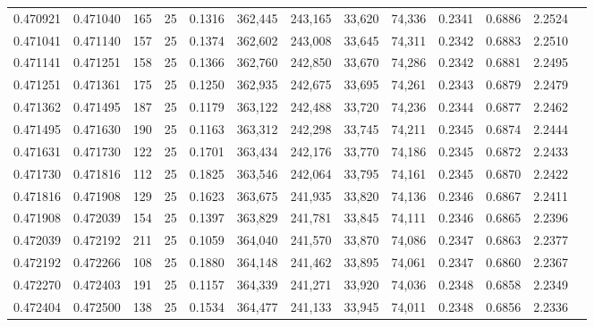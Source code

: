 \begin{tabular}{rrrrrrrrrrrrr}
0.470921 & 0.471040 &   165 &  25 &                                     0.1316 & 362,445 & 243,165 &  33,620 &  74,336 & 0.2341 & 0.6886 & 2.2524 \\
0.471041 & 0.471140 &   157 &  25 &                                     0.1374 & 362,602 & 243,008 &  33,645 &  74,311 & 0.2342 & 0.6883 & 2.2510 \\
0.471141 & 0.471251 &   158 &  25 &                                     0.1366 & 362,760 & 242,850 &  33,670 &  74,286 & 0.2342 & 0.6881 & 2.2495 \\
0.471251 & 0.471361 &   175 &  25 &                                     0.1250 & 362,935 & 242,675 &  33,695 &  74,261 & 0.2343 & 0.6879 & 2.2479 \\
0.471362 & 0.471495 &   187 &  25 &                                     0.1179 & 363,122 & 242,488 &  33,720 &  74,236 & 0.2344 & 0.6877 & 2.2462 \\
0.471495 & 0.471630 &   190 &  25 &                                     0.1163 & 363,312 & 242,298 &  33,745 &  74,211 & 0.2345 & 0.6874 & 2.2444 \\
0.471631 & 0.471730 &   122 &  25 &                                     0.1701 & 363,434 & 242,176 &  33,770 &  74,186 & 0.2345 & 0.6872 & 2.2433 \\
0.471730 & 0.471816 &   112 &  25 &                                     0.1825 & 363,546 & 242,064 &  33,795 &  74,161 & 0.2345 & 0.6870 & 2.2422 \\
0.471816 & 0.471908 &   129 &  25 &                                     0.1623 & 363,675 & 241,935 &  33,820 &  74,136 & 0.2346 & 0.6867 & 2.2411 \\
0.471908 & 0.472039 &   154 &  25 &                                     0.1397 & 363,829 & 241,781 &  33,845 &  74,111 & 0.2346 & 0.6865 & 2.2396 \\
0.472039 & 0.472192 &   211 &  25 &                                     0.1059 & 364,040 & 241,570 &  33,870 &  74,086 & 0.2347 & 0.6863 & 2.2377 \\
0.472192 & 0.472266 &   108 &  25 &                                     0.1880 & 364,148 & 241,462 &  33,895 &  74,061 & 0.2347 & 0.6860 & 2.2367 \\
0.472270 & 0.472403 &   191 &  25 &                                     0.1157 & 364,339 & 241,271 &  33,920 &  74,036 & 0.2348 & 0.6858 & 2.2349 \\
0.472404 & 0.472500 &   138 &  25 &                                     0.1534 & 364,477 & 241,133 &  33,945 &  74,011 & 0.2348 & 0.6856 & 2.2336 \\

\end{tabular}

